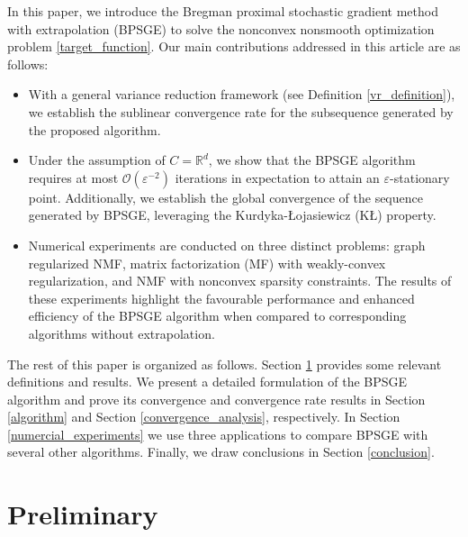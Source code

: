 \documentclass[letterpaper]{article} %
\begin{document}
	
	In this paper, we introduce the Bregman proximal stochastic gradient method with extrapolation (BPSGE) to solve the nonconvex nonsmooth optimization problem \eqref{target_function}. Our main contributions addressed in this article are as follows:
	\begin{itemize}
		\item With a general variance reduction framework (see Definition \ref{vr_definition}), we establish the sublinear convergence rate for the subsequence %
		generated by the proposed algorithm.
		\item Under the assumption of $C=\mathbb{R}^{d}$, we show that the BPSGE algorithm  requires at most $\mathcal{O}(\varepsilon^{-2})$ iterations in expectation to attain an $\varepsilon$-stationary point. Additionally, we establish the global convergence of the {sequence} generated by   BPSGE, leveraging the Kurdyka-{\L}ojasiewicz (K{\L}) property. 
		\item Numerical experiments are conducted on three distinct problems: graph regularized NMF, matrix factorization (MF) with weakly-convex regularization, and  NMF with nonconvex sparsity constraints. The results of these experiments highlight the favourable performance and enhanced efficiency of the BPSGE algorithm when compared to corresponding algorithms without extrapolation.
	\end{itemize}
	
	The rest of this paper is organized as follows. Section \ref{preliminary} provides some relevant deﬁnitions and results. We present a detailed formulation of the BPSGE algorithm and prove its convergence and convergence rate results in Section \ref{algorithm} and Section \ref{convergence_analysis}, respectively. In Section \ref{numercial_experiments} we use three applications to compare BPSGE with several other algorithms. Finally, we draw conclusions in Section \ref{conclusion}.
	
	
	\section{Preliminary}\label{preliminary}
	
\end{document}
